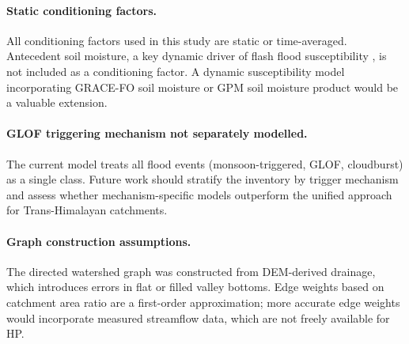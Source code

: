 \paragraph{Static conditioning factors.}
All conditioning factors used in this study are static or time-averaged.
Antecedent soil moisture, a key dynamic driver of flash flood susceptibility
\citep{dixit2026nhess}, is not included as a conditioning factor.
A dynamic susceptibility model incorporating GRACE-FO soil moisture
or GPM soil moisture product would be a valuable extension.

\paragraph{GLOF triggering mechanism not separately modelled.}
The current model treats all flood events (monsoon-triggered, GLOF, cloudburst)
as a single class.
Future work should stratify the inventory by trigger mechanism
and assess whether mechanism-specific models outperform the unified approach
for Trans-Himalayan catchments.

\paragraph{Graph construction assumptions.}
The directed watershed graph was constructed from DEM-derived drainage,
which introduces errors in flat or filled valley bottoms.
Edge weights based on catchment area ratio are a first-order approximation;
more accurate edge weights would incorporate measured streamflow data,
which are not freely available for HP.
